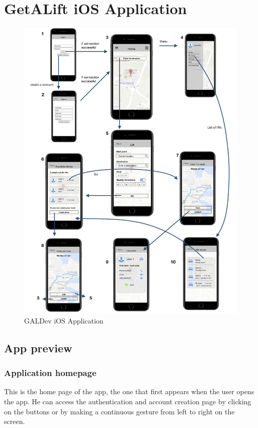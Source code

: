 \section{GetALift iOS Application}
\begin{figure}[h!]
\begin{center}
\includegraphics[scale = 0.35]{diagrams/iOSApplication.png} 
\end{center}
\caption{GALDev iOS Application}
\end{figure}

\subsection{App preview}

\subsubsection{Application homepage}
This is the home page of the app, the one that first appears when the user opens the app. He can access the authentication and account creation page by clicking on the buttons or by making a continuous gesture from left to right on the screen.

